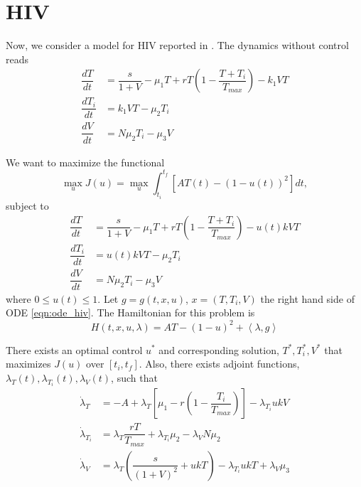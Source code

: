 \section{HIV} %

Now, we consider a model for HIV reported in \citep{butler1997optimal}.
The dynamics without control reads
\begin{align*}
    \dfrac{dT}{dt} &= \dfrac{s}{1 + V} - \mu_{1}T + rT \left( 1 - %
                        \dfrac{T + T_{i}}{T_{max}} \right) - k_{1}VT \\
    \dfrac{dT_{i}}{dt} &= k_{1}VT - \mu_{2}T_{i} \\
    \dfrac{dV}{dt} &= N \mu_2 T_{i} - \mu_{3}V
\end{align*}

We want to maximize the functional
$$
    \max_{u} J(u) = \max_{u} \int_{t_i}^{t_f} {\left[ AT(t) - 
                    (1 - u(t))^{2} \right]} dt, 
$$
subject to 
\begin{equation}
\label{eqn:ode_hiv}
    \begin{aligned}
        \dfrac{dT}{dt} &= \dfrac{s}{1 + V} - \mu_{1}T + rT \left( 1 - %
            \dfrac{T + T_{i}}{T_{max}} \right) - u(t)kVT \\
        \dfrac{dT_{i}}{dt} &= u(t)kVT - \mu_{2}T_{i} \\
        \dfrac{dV}{dt} &= N \mu_2 T_{i} - \mu_{3}V
    \end{aligned}
\end{equation}
where $ 0 \leq u(t) \leq 1 $. 
Let $g =g(t,x,u)$, 
    $x = (T,T_i,V)$ the right hand side of ODE \eqref{eqn:ode_hiv}. 
The Hamiltonian for this problem is
$$
    H(t,x,u,\lambda) = AT - (1 - u)^{2} + \left<\lambda, g \right> 
$$
\begin{theorem}
    There exists an optimal control $u^{*}$ and corresponding solution, 
    $T^{*}, T_{i}^{*}, V^{*}$ that maximizes $J(u)$ over $[t_i, t_f]$. 
    Also, there exists adjoint functions, $\lambda_{T}(t), %
    \lambda_{T_i}(t),\lambda_{V}(t)$, such that
    \begin{align*}
        \dot{\lambda}_{T}   &=  - A + \lambda_{T} \left[\mu_1 - r\left(1 -         \dfrac{T_i}{T_{max}}\right) \right] - \lambda_{T_i} ukV      \\ 
        \dot{\lambda}_{T_i} &=  \lambda_{T}\dfrac{rT}{T_{max}} + 
            \lambda_{T_i}\mu_2 - \lambda_{V}N\mu_2                      \\
        \dot{\lambda}_{V}   &=  \lambda_{T} \left(\dfrac{s}{(1+V)^2} + 
            ukT\right) - \lambda_{T_i}ukT + \lambda_{V}\mu_{3}   
    \end{align*}
\end{theorem}

